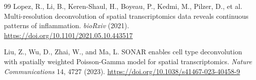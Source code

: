 \documentclass[11pt]{article}
\begin{document}
\begin{thebibliography}{99}
Lopez, R., Li, B., Keren-Shaul, H., Boyeau, P., Kedmi, M., Pilzer, D., et al.
Multi-resolution deconvolution of spatial transcriptomics data reveals continuous patterns of inflammation.
\textit{bioRxiv} (2021).
\url{https://doi.org/10.1101/2021.05.10.443517}

Liu, Z., Wu, D., Zhai, W., and Ma, L.
SONAR enables cell type deconvolution with spatially weighted Poisson-Gamma model for spatial transcriptomics.
\textit{Nature Communications} 14, 4727 (2023).
\url{https://doi.org/10.1038/s41467-023-40458-9}

\end{thebibliography}
\end{document}
